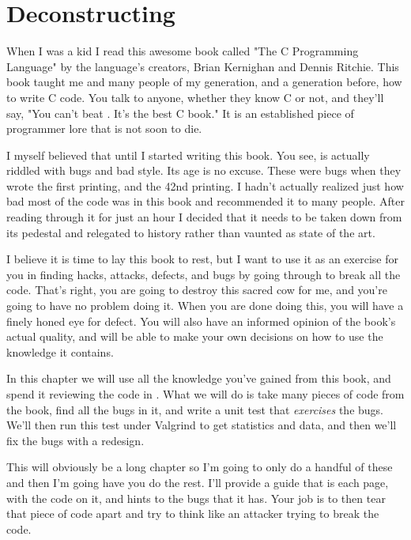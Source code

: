 \chapter{Deconstructing \krc}

When I was a kid I read this awesome book called "The C Programming Language"
by the language's creators, Brian Kernighan and Dennis Ritchie.  This book 
taught me and many people of my generation, and a generation before, how to
write C code.  You talk to anyone, whether they know C or not, and they'll
say, "You can't beat \krc. It's the best C book."  It is an established
piece of programmer lore that is not soon to die.

I myself believed that until I started writing this book. You see, \krc is
actually riddled with bugs and bad style.  Its age is no excuse. These were
bugs when they wrote the first printing, and the 42nd printing.  I hadn't
actually realized just how bad most of the code was in this book and recommended
it to many people.  After reading through it for just an hour I decided that it
needs to be taken down from its pedestal and relegated to history rather than
vaunted as state of the art.

I believe it is time to lay this book to rest, but I want to use it as an
exercise for you in finding hacks, attacks, defects, and bugs by going through
\krc to break all the code.  That's right, you are going to destroy this
sacred cow for me, and you're going to have no problem doing it.  When you are
done doing this, you will have a finely honed eye for defect.  You will also
have an informed opinion of the book's actual quality, and will be able to make
your own decisions on how to use the knowledge it contains.

In this chapter we will use all the knowledge you've gained from
this book, and spend it reviewing the code in \krc.  What we will do is
take many pieces of code from the book, find all the bugs in it, and write
a unit test that \emph{exercises} the bugs.  We'll then run this test under
Valgrind to get statistics and data, and then we'll fix the bugs with a redesign.

This will obviously be a long chapter so I'm going to only do a handful of
these and then I'm going have you do the rest.  I'll provide a guide that is
each page, with the code on it, and hints to the bugs that it has.  Your job is
to then tear that piece of code apart and try to think like an attacker trying
to break the code.

